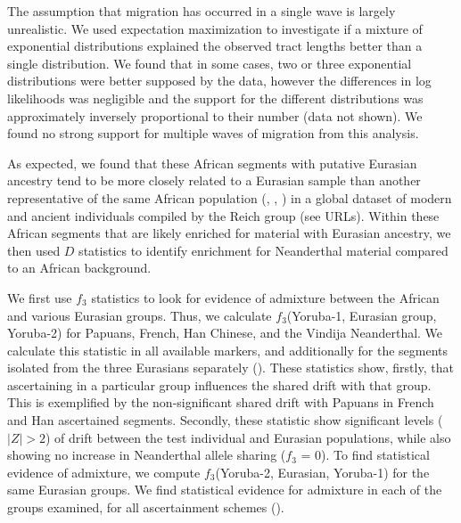 The assumption that migration has occurred in a single wave is largely unrealistic. We used expectation maximization to investigate if a mixture of exponential distributions explained the observed tract lengths better than a single distribution. We found that in some cases, two or three exponential distributions were better supposed by the data, however the differences in log likelihoods was negligible and the support for the different distributions was approximately inversely proportional to their number (data not shown). We found no strong support for multiple waves of migration from this analysis.


As expected, we found that these African segments with putative Eurasian ancestry tend to be more closely related to a Eurasian sample than another representative of the same African population (, , ) in a global dataset of modern and ancient individuals compiled by the Reich group (see URLs). Within these African segments that are likely enriched for material with Eurasian ancestry, we then used $D$ statistics \cite{Patterson2012} to identify enrichment for Neanderthal material compared to an African background. 

We first use $f_3$ statistics to look for evidence of admixture between the African and various Eurasian groups. Thus, we calculate $f_3$(Yoruba-1, Eurasian group, Yoruba-2) for Papuans, French, Han Chinese, and the Vindija Neanderthal. We calculate this statistic in all available markers, and additionally for the segments isolated from the three Eurasians separately (). These statistics show, firstly, that ascertaining in a particular group influences the shared drift with that group. This is exemplified by the non-significant shared drift with Papuans in French and Han ascertained segments. Secondly, these statistic show significant levels ($|Z|>2$) of drift between the test individual and Eurasian populations, while also showing no increase in Neanderthal allele sharing ($f_3$ = 0). To find statistical evidence of admixture, we compute $f_3$(Yoruba-2, Eurasian, Yoruba-1) for the same Eurasian groups. We find statistical evidence for admixture in each of the groups examined, for all ascertainment schemes (). 


